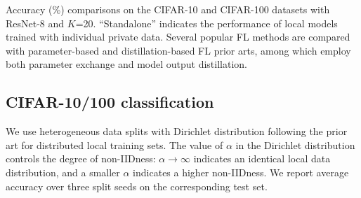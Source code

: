\documentclass[letterpaper]{article} %
\begin{document}
\begin{table}[]
\caption{Accuracy (\%) comparisons on the CIFAR-10 and CIFAR-100 datasets with ResNet-8 and $K$=20. ``Standalone'' indicates the performance of local models trained with individual private data. Several popular FL methods are compared with parameter-based and distillation-based FL prior arts, among which \cite{lin2020ensemble, zhu2021data} employ both parameter exchange and model output distillation.}
\label{tab:cifarcompare}
\end{table}



\subsection{CIFAR-10/100 classification}
We use heterogeneous data splits with Dirichlet distribution following the prior art \cite{hsu2019measuring} for distributed local training sets. The value of $\alpha$ in the Dirichlet distribution controls the degree of non-IIDness: $\alpha \rightarrow \infty$ indicates an identical local data distribution, and a smaller $\alpha$ indicates a higher non-IIDness. We report average accuracy over three split seeds on the corresponding test set.
\end{document}
